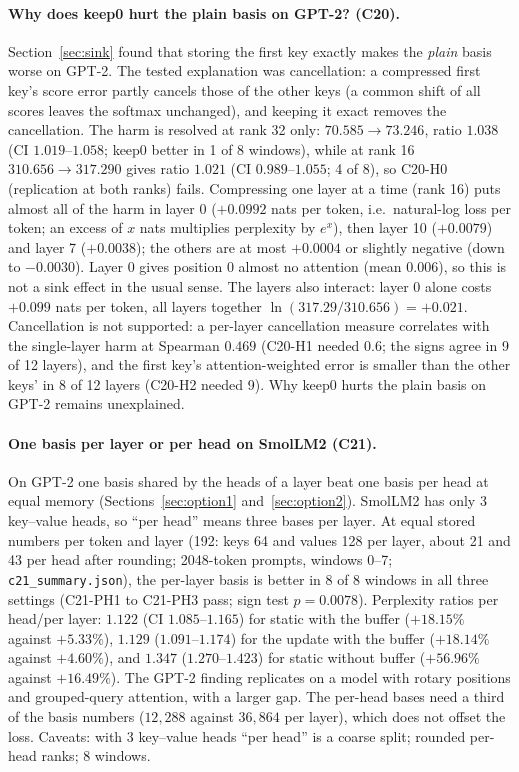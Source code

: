 \documentclass[10pt]{article}
\theoremstyle{plain}
\theoremstyle{definition}
\theoremstyle{remark}
\newcommand{\rl}[1]{\textsf{#1}}%
\begin{document}
\paragraph{Why does keep0 hurt the plain basis on GPT-2? (C20).} Section~\ref{sec:sink} found that storing the first key exactly makes the \emph{plain} basis worse on GPT-2. The tested explanation was cancellation: a compressed first key's score error partly cancels those of the other keys (a common shift of all scores leaves the softmax unchanged), and keeping it exact removes the cancellation. The harm is resolved at rank 32 only: $70.585\to73.246$, ratio $1.038$ (CI $1.019$--$1.058$; keep0 better in 1 of 8 windows), while at rank 16 $310.656\to317.290$ gives ratio $1.021$ (CI $0.989$--$1.055$; 4 of 8), so \rl{C20-H0} (replication at both ranks) fails. Compressing one layer at a time (rank 16) puts almost all of the harm in layer 0 ($+0.0992$ nats per token, i.e.\ natural-log loss per token; an excess of $x$ nats multiplies perplexity by $e^x$), then layer 10 ($+0.0079$) and layer 7 ($+0.0038$); the others are at most $+0.0004$ or slightly negative (down to $-0.0030$). Layer 0 gives position 0 almost no attention (mean $0.006$), so this is not a sink effect in the usual sense. The layers also interact: layer 0 alone costs $+0.099$ nats per token, all layers together $\ln(317.29/310.656)=+0.021$. Cancellation is not supported: a per-layer cancellation measure correlates with the single-layer harm at Spearman $0.469$ (\rl{C20-H1} needed $0.6$; the signs agree in 9 of 12 layers), and the first key's attention-weighted error is smaller than the other keys' in 8 of 12 layers (\rl{C20-H2} needed 9). Why keep0 hurts the plain basis on GPT-2 remains unexplained.

\paragraph{One basis per layer or per head on SmolLM2 (C21).} On GPT-2 one basis shared by the heads of a layer beat one basis per head at equal memory (Sections~\ref{sec:option1} and~\ref{sec:option2}). SmolLM2 has only 3 key--value heads, so ``per head'' means three bases per layer. At equal stored numbers per token and layer (192: keys 64 and values 128 per layer, about 21 and 43 per head after rounding; 2048-token prompts, windows 0--7; \texttt{c21\_summary.json}), the per-layer basis is better in 8 of 8 windows in all three settings (\rl{C21-PH1} to \rl{C21-PH3} pass; sign test $p=0.0078$). Perplexity ratios per head/per layer: $1.122$ (CI $1.085$--$1.165$) for static with the buffer ($+18.15\%$ against $+5.33\%$), $1.129$ ($1.091$--$1.174$) for the update with the buffer ($+18.14\%$ against $+4.60\%$), and $1.347$ ($1.270$--$1.423$) for static without buffer ($+56.96\%$ against $+16.49\%$). The GPT-2 finding replicates on a model with rotary positions and grouped-query attention, with a larger gap. The per-head bases need a third of the basis numbers ($12{,}288$ against $36{,}864$ per layer), which does not offset the loss. Caveats: with 3 key--value heads ``per head'' is a coarse split; rounded per-head ranks; 8 windows.
\end{document}

